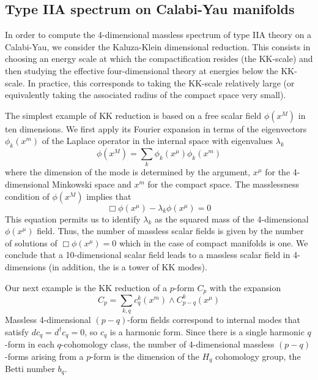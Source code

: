 \subsection{Type IIA spectrum on Calabi-Yau manifolds}
In order to compute the 4-dimensional massless spectrum of type IIA theory on a Calabi-Yau, we consider the 
Kaluza-Klein dimensional reduction.
This consists in choosing an energy scale at which the compactification resides (the KK-scale)
and then studying the effective four-dimensional theory at energies below the KK-scale.
In practice, this corresponds to taking the KK-scale relatively large (or equivalently taking the associated radius of the compact space very small). 

The simplest example of KK reduction is based on a free scalar field $\phi(x^M)$ in ten dimensions.
We first apply its Fourier expansion in terms of the eigenvectors $\phi_k(x^m)$ of the Laplace operator in the internal space  with eigenvalues $\lambda_k$
\begin{equation}
  \phi(x^M)= \sum_k \phi_k(x^\mu)\phi_k(x^m)
\end{equation}
where the dimension of the mode is determined by the argument, $x^\mu$ for the 4-dimensional Minkowski space and $x^m$ for the compact space.
The masslessness condition of $\phi(x^M)$ implies that
\begin{equation}
 \Box \phi(x^\mu) - \lambda_k \phi(x^\mu)=0 
\end{equation}
This equation permits us to identify $\lambda_k$  as the squared mass of the 4-dimensional $\phi(x^\mu)$ field.
Thus, the number of massless scalar fields is given by the number of solutions of $\Box \phi(x^\mu)=0$ which in the
case of compact manifolds is one.
We conclude that a 10-dimensional scalar field leads to a massless scalar field in 4-dimensions (in addition, the is a tower of KK modes).

Our next example is the KK reduction of a $p$-form $C_p$ with the expansion 
\begin{equation}
  C_p=\sum_{k,q} c_q^k(x^m)\wedge C^k_{p-q}(x^\mu)
\end{equation}
Massless 4-dimensional $(p-q)$-form fields correspond to internal modes that satisfy $dc_q=d^\dagger c_q=0$, so 
$c_q$ is a harmonic form.
Since there is a single harmonic $q$-form in each $q$-cohomology class, 
the number of 4-dimensional massless $(p-q)$-forms arising from a $p$-form is the dimension of the $H_q$ cohomology group, the 
Betti number $b_q$.

